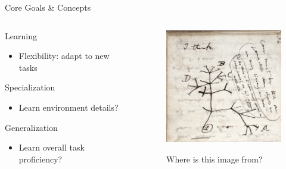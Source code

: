 \documentclass[aspectratio=169]{beamer}
\makeatletter
\renewcommand{\emph}[1]{{\Huge \color{pureminimalistic@text@red} #1}}
\makeatother
\begin{document}
\begin{frame}{{\color{pureminimalistic@text@white} Core Goals \& Concepts}}
  \begin{columns}[T]
      \begin{column}{.6\linewidth}
          \begin{vfilleditems}
            \item \emph{Learning}
              \begin{itemize}
                \item {\Medium Flexibility: adapt to new tasks}
              \end{itemize}
            \vspace{1em}
            \item \emph{Specialization}
              \begin{itemize}
                \item {\Medium Learn environment details?}
              \end{itemize}
            \vspace{1em}
            \item \emph{Generalization}
              \begin{itemize}
                \item {\Medium Learn overall task proficiency?}
              \end{itemize}
          \end{vfilleditems}
      \end{column}
      \begin{column}{.4\linewidth}
          \begin{figure}
              \centering
              \caption{Where is this image from?}
              \includegraphics[height=5cm, keepaspectratio]{figures/i_think.png}
              \label{fig:my_label}
          \end{figure}
      \end{column}
  \end{columns}
\end{frame}
\end{document}
